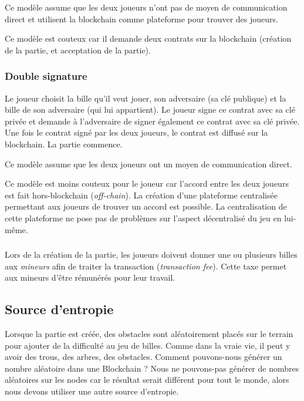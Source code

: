 \documentclass{article}
\begin{document}
Ce modèle assume que les deux joueurs n'ont pas de moyen de communication direct et utilisent la blockchain comme plateforme pour trouver des joueurs.

Ce modèle est couteux car il demande deux contrats sur la blockchain (création de la partie, et acceptation de la partie).


\subsubsection{Double signature}
Le joueur choisit la bille qu'il veut jouer, son adversaire (sa clé publique) et la bille de son adversaire (qui lui appartient). Le joueur signe ce contrat avec sa clé privée et demande à l'adversaire de signer également ce contrat avec sa clé privée. Une fois le contrat signé par les deux joueurs, le contrat est diffusé sur la blockchain. La partie commence.

Ce modèle assume que les deux joueurs ont un moyen de communication direct.

Ce modèle est moins couteux pour le joueur car l'accord entre les deux joueurs est fait hors-blockchain (\textit{off-chain}).
La création d'une plateforme centralisée permettant aux joueurs de trouver un accord est possible. La centralisation de cette plateforme ne pose pas de problèmes sur l'aspect décentralisé du jeu en lui-même.

\subsubsection*{}

Lors de la création de la partie, les joueurs doivent donner une ou plusieurs billes aux \textit{mineurs} afin de traiter la transaction (\textit{transaction fee}). Cette taxe permet aux mineurs d'être rémunérés pour leur travail.


\subsection{Source d'entropie}
Lorsque la partie est créée, des obstacles sont aléatoirement placés sur le terrain pour ajouter de la difficulté au jeu de billes. Comme dans la vraie vie, il peut y avoir des trous, des arbres, des obstacles. Comment pouvons-nous générer un nombre aléatoire dans une Blockchain ?
Nous ne pouvons-pas générer de nombres aléatoires sur les nodes car le résultat serait différent pour tout le monde, alors nous devons utiliser une autre source d'entropie.
\end{document}

